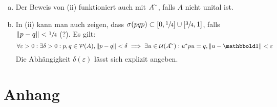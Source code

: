 \begin{bemerkung}[label=bem:69]
	\begin{enumerate}[a)]
		\item Der Beweis von (ii) funktioniert auch mit $A^\simm$, falls $A$ nicht unital ist.
		\item In (ii) kann man auch zeigen, dass $\sigma(p qp) \subset [0,\sfrac{1}{4}] \cup [\sfrac{3}{4},1]$, falls $\norm*{p-q} < \sfrac{1}{4}$ (?).
		Es gilt: 
		\[
			\forall \varepsilon>0 : \exists \delta>0 : p,q \in \mathcal{P}(A), \norm*{p-q}<\delta \implies \exists u \in \mathcal{U}(A^\simm) : u^* pu = q , \norm*{u-\ind} < \varepsilon
		\]
		Die Abhängigkeit $\delta(\varepsilon)$ lässt sich explizit angeben.
	\end{enumerate}
\end{bemerkung}



\cleardoubleoddemptypage
{}
\setcounter{page}{1}
\cleardoubleoddemptypage
\appendix

\section{Anhang} %
\label{sec:anhang}

\printindex
\printbibliography
\listoffigures
\todototoc
{}

